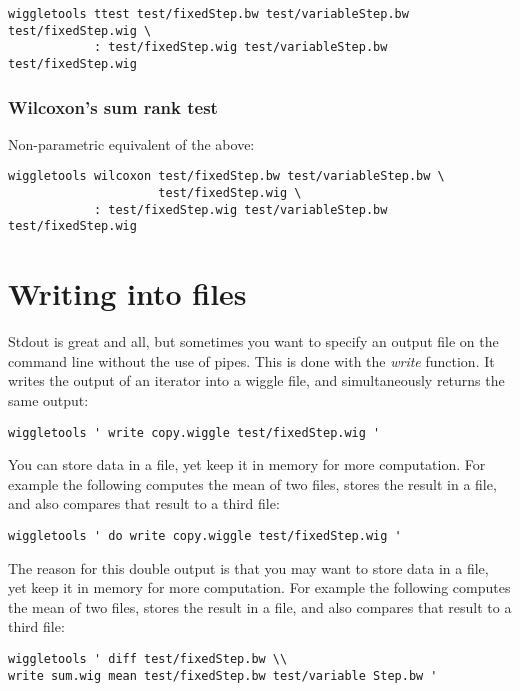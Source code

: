 \documentclass[12pt]{article}
\begin{document}
\begin{verbatim}
wiggletools ttest test/fixedStep.bw test/variableStep.bw test/fixedStep.wig \
            : test/fixedStep.wig test/variableStep.bw test/fixedStep.wig
\end{verbatim}

\subsubsection{Wilcoxon's sum rank test}

Non-parametric equivalent of the above:

\begin{verbatim}
wiggletools wilcoxon test/fixedStep.bw test/variableStep.bw \
                     test/fixedStep.wig \
            : test/fixedStep.wig test/variableStep.bw test/fixedStep.wig
\end{verbatim}

\section{Writing into files}

Stdout is great and all, but sometimes you want to specify an output file on the command line without the use of pipes. This is done with the \emph{write} function. It writes the output of an iterator into a wiggle file, and simultaneously returns the same output:

\begin{verbatim}
wiggletools ' write copy.wiggle test/fixedStep.wig '
\end{verbatim}

You can store data in a file, yet keep it in memory for more computation. For example the following computes the mean of two files, stores the result in a file, and also compares that result to a third file:

\begin{verbatim}
wiggletools ' do write copy.wiggle test/fixedStep.wig '
\end{verbatim}

The reason for this double output is that you may want to store data in a file, yet keep it in memory for more computation. For example the following computes the mean of two files, stores the result in a file, and also compares that result to a third file:

\begin{verbatim}
wiggletools ' diff test/fixedStep.bw \\
write sum.wig mean test/fixedStep.bw test/variable Step.bw '
\end{verbatim}
\end{document}
